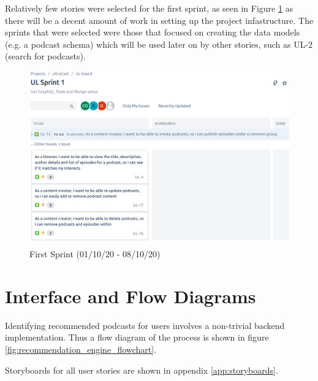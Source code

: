 \documentclass[12pt]{article}
\begin{document}
Relatively few stories were selected for the first sprint, as seen in Figure \ref{fig:first_sprint}
as there will be a decent amount of work in setting up the project infastructure. 
The sprints that were selected were those that focused on creating the data models 
(e.g. a podcast schema) which will be used later on by other stories, such as UL-2 
(search for podcasts).

\begin{figure}[ht]
    \centering
    \includegraphics[width=\textwidth]{resources/sprint1}
    \caption{First Sprint (01/10/20 - 08/10/20)}
    \label{fig:first_sprint}
\end{figure}

\section{Interface and Flow Diagrams}

Identifying recommended podcasts for users involves a non-trivial backend implementation. Thus a flow diagram of the process is shown in figure \ref{fig:recommendation_engine_flowchart}.

Storyboards for all user stories are shown in appendix \ref{app:storyboards}.
\end{document}
